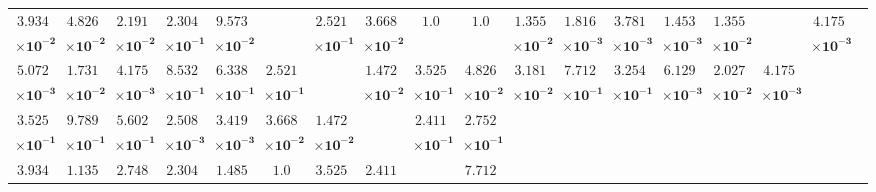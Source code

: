 \begin{table}[!ht]
{\begin{tabular}{|c|c|c|c|c|c|c|c|c|c|c|c|c|c|c|c|c|c|c|}
			$\mathbf{3.934}$ & $\mathbf{4.826}$ & $\mathbf{2.191}$ & $\mathbf{2.304}$ & $\mathbf{9.573}$ & \multirow{2}{*}{} & $\mathbf{2.521}$ & $\mathbf{3.668}$ & \multirow{2}{*}{$\mathbf{1.0}$} & \multirow{2}{*}{$\mathbf{1.0}$} & $\mathbf{1.355}$ & $\mathbf{1.816}$ & $\mathbf{3.781}$ & $\mathbf{1.453}$ & $\mathbf{1.355}$ & \multirow{2}{*}{} & $\mathbf{4.175}$ & \multicolumn{2}{c}{} \\ 
			$\mathbf{\times 10^{-2}}$ & $\mathbf{\times 10^{-2}}$ & $\mathbf{\times 10^{-2}}$ & $\mathbf{\times 10^{-1}}$ & $\mathbf{\times 10^{-2}}$ & & $\mathbf{\times 10^{-1}}$ & $\mathbf{\times 10^{-2}}$ & & & $\mathbf{\times 10^{-2}}$ & $\mathbf{\times 10^{-3}}$ & $\mathbf{\times 10^{-3}}$ & $\mathbf{\times 10^{-3}}$ & $\mathbf{\times 10^{-2}}$ & & $\mathbf{\times 10^{-3}}$ & \multicolumn{2}{c}{} \\ \cline{1-17}
			$\mathbf{5.072}$ & $\mathbf{1.731}$ & $\mathbf{4.175}$ & $\mathbf{8.532}$ & $\mathbf{6.338}$ & $\mathbf{2.521}$ & \multirow{2}{*}{} & $\mathbf{1.472}$ & $\mathbf{3.525}$ & $\mathbf{4.826}$ & $\mathbf{3.181}$ & $\mathbf{7.712}$ & $\mathbf{3.254}$ & $\mathbf{6.129}$ & $\mathbf{2.027}$ & $\mathbf{4.175}$ & \multirow{2}{*}{} & \multicolumn{2}{c}{} \\ 
			$\mathbf{\times 10^{-3}}$ & $\mathbf{\times 10^{-2}}$ & $\mathbf{\times 10^{-3}}$ & $\mathbf{\times 10^{-1}}$ & $\mathbf{\times 10^{-1}}$ & $\mathbf{\times 10^{-1}}$ & & $\mathbf{\times 10^{-2}}$ & $\mathbf{\times 10^{-1}}$ & $\mathbf{\times 10^{-2}}$ & $\mathbf{\times 10^{-2}}$ & $\mathbf{\times 10^{-1}}$ & $\mathbf{\times 10^{-1}}$ & $\mathbf{\times 10^{-3}}$ & $\mathbf{\times 10^{-2}}$ & $\mathbf{\times 10^{-3}}$ & & \multicolumn{2}{c}{} \\ \cline{1-17}
			$\mathbf{3.525}$ & $\mathbf{9.789}$ & $\mathbf{5.602}$ & $\mathbf{2.508}$ & $\mathbf{3.419}$ & $\mathbf{3.668}$ & $\mathbf{1.472}$ & \multirow{2}{*}{} & $\mathbf{2.411}$ & $\mathbf{2.752}$ & \multicolumn{9}{c}{} \\ 
			$\mathbf{\times 10^{-1}}$ & $\mathbf{\times 10^{-1}}$ & $\mathbf{\times 10^{-1}}$ & $\mathbf{\times 10^{-3}}$ & $\mathbf{\times 10^{-3}}$ & $\mathbf{\times 10^{-2}}$ & $\mathbf{\times 10^{-2}}$ & & $\mathbf{\times 10^{-1}}$ & $\mathbf{\times 10^{-1}}$ & \multicolumn{9}{c}{} \\ \cline{1-10}
			$\mathbf{3.934}$ & $\mathbf{1.135}$ & $\mathbf{2.748}$ & $\mathbf{2.304}$ & $\mathbf{1.485}$ & \multirow{2}{*}{$\mathbf{1.0}$} & $\mathbf{3.525}$ & $\mathbf{2.411}$ & \multirow{2}{*}{} & $\mathbf{7.712}$ & \multicolumn{9}{c}{} \\ 

\end{tabular}}
\end{table}
